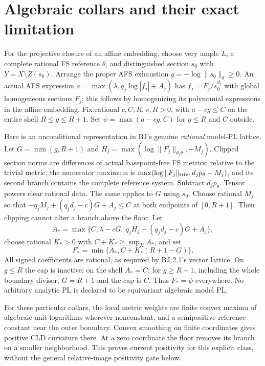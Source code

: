 \documentclass[
  11pt,
]{article}
\begin{document}
\section{Algebraic collars and their exact
limitation}\label{algebraic-collars-and-their-exact-limitation}

For the projective closure of an affine embedding, choose very ample
\(L\), a complete rational FS reference \(\theta\), and distinguished
section \(s_0\) with \(Y=X\setminus Z(s_0)\). Arrange the proper AFS
exhaustion \(g=-\log\|s_0\|_\theta\ge0\). An actual AFS expression
\(a=\max(\lambda,q_j\log|f_j|+A_j)\) has \(f_j=F_j/s_0^{d_j}\) with
global homogeneous sections \(F_j\); this follows by homogenizing its
polynomial expressions in the affine embedding. Fix rational \(c,C,R\),
\(c,R>0\), with \(a-cg\le C\) on the entire shell \(R\le g\le R+1\). Set
\(\psi=\max(a-cg,C)\) for \(g\le R\) and \(C\) outside.

Here is an unconditional representation in BJ's genuine \emph{rational}
model-PL lattice. Let \(G=\min(g,R+1)\) and
\(H_j=\max(\log\|F_j\|_{d_j\theta},-M_j)\). Clipped section norms are
differences of actual basepoint-free FS metrics: relative to the trivial
metric, the numerator maximum is
\(\max(\log\|F_j\|_{\rm triv},d_jp_\theta-M_j)\), and its second branch
contains the complete reference system. Subtract \(d_jp_\theta\). Tensor
powers clear rational data. The same applies to \(G\) using \(s_0\).
Choose rational \(M_j\) so that \(-q_jM_j+(q_jd_j-c)G+A_j\le C\) at both
endpoints of \([0,R+1]\). Then clipping cannot alter a branch above the
floor. Let \[A_*=\max\{C,\lambda-cG,\ q_jH_j+(q_jd_j-c)G+A_j\},\] choose
rational \(K_*>0\) with \(C+K_*\ge\sup_X A_*\), and set
\[F_*=\min\{A_*,C+K_*(R+1-G)\}.                                      \tag{18}\]
All signed coefficients are rational, as required by BJ 2.1's vector
lattice. On \(g\le R\) the cap is inactive; on the shell \(A_*=C\); for
\(g\ge R+1\), including the whole boundary divisor, \(G=R+1\) and the
cap is \(C\). Thus \(F_*=\psi\) everywhere. No arbitrary analytic PL is
declared to be equivariant algebraic model PL.

For these particular collars, the local metric weights are finite convex
maxima of algebraic unit logarithms wherever nonconstant, and a
semipositive-reference constant near the outer boundary. Convex
smoothing on finite coordinates gives positive CLD curvature there. At a
zero coordinate the floor removes its branch on a smaller neighborhood.
This proves current positivity for this explicit class, without the
general relative-image positivity gate below.
\end{document}
